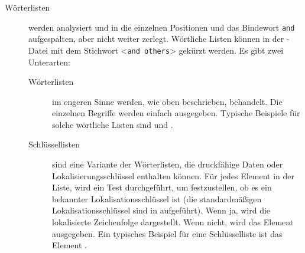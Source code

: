 \documentclass{ltxdockit}[2011/03/25]
\begin{document}
\begin{description}
\item[Wörterlisten] werden analysiert und in die einzelnen Positionen und das
Bindewort \texttt{and} aufgespalten, aber nicht weiter zerlegt. Wörtliche Listen
können in der -Datei mit dem Stichwort <\texttt{and others}> gekürzt
werden. Es gibt zwei Unterarten: 

\begin{description}

\item[Wörterlisten] im engeren Sinne werden, wie oben beschrieben, behandelt. Die
einzelnen Begriffe werden einfach ausgegeben. Typische Beispiele für solche
wörtliche Listen sind  und . 

\item[Schlüssellisten] sind eine Variante der Wörterlisten, die druckfähige
Daten oder Lokalisierungsschlüssel enthalten können. Für jedes Element in der
Liste, wird ein Test durchgeführt, um festzustellen, ob es ein bekannter
Lokalisationsschlüssel ist (die standardmäßigen Lokalisationsschlüssel sind in
 aufgeführt). Wenn ja, wird die lokalisierte Zeichenfolge
dargestellt. Wenn nicht, wird das Element ausgegeben. Ein typisches Beispiel für
eine Schlüsselliste ist das Element . 

\end{description} 
\end{description}
\end{document}
